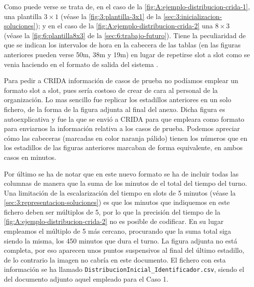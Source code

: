 Como puede verse se trata de, en el caso de la \autoref{fig:A:ejemplo-distribucion-crida-1}, una plantilla $3\times1$ (véase la \autoref{fig:3:plantilla-3x1} de la \autoref{sec:3:inicializacion-soluciones}); y en el caso de la \autoref{fig:A:ejemplo-distribucion-crida-2} una $8\times3$ (véase la \autoref{fig:6:plantilla8x3} de la \autoref{sec:6:trabajo-futuro}). Tiene la peculiaridad de que se indican los intervalos de hora en la cabecera de las tablas (en las figuras anteriores pueden verse 50m, 38m y 19m) en lugar de repetirse slot a slot como se venia haciendo en el formato de salida del sistema \legacy{}. 

Para pedir a CRIDA información de casos de prueba no podíamos emplear un formato slot a slot, pues sería costoso de crear de cara al personal de la organización. Lo mas sencillo fue replicar los estadillos anteriores en un solo fichero, de la forma de la figura adjunta al final del anexo. Dicha figura es autoexplicativa y fue la que se envió a CRIDA para que empleara como formato para enviarnos la información relativa a los casos de prueba. Podemos apreciar cómo las cabeceras (marcadas en color naranja pálido) tienen los números que en los estadillos de las figuras anteriores marcaban de forma equivalente, en ambos casos en minutos.

Por último se ha de notar que en este nuevo formato se ha de incluir todas las columnas de manera que la suma de los minutos de el total del tiempo del turno. Una limitación de la escalarización del tiempo en slots de 5 minutos (véase la \autoref{sec:3:representacion-soluciones}) es que los minutos que indiquemos en este fichero deben ser múltiplos de 5, por lo que la precisión del tiempo de la \autoref{fig:A:ejemplo-distribucion-crida-2} no es posible de codificar. En su lugar empleamos el múltiplo de 5 más cercano, procurando que la suma total siga siendo la misma, los 450 minutos que dura el turno. La figura adjunta no está completa, por eso aparecen unos puntos suspensivos al final del último estadillo, de lo contrario la imagen no cabría en este documento. El fichero con esta información se ha llamado \texttt{DistribucionInicial\_Identificador.csv}, siendo el del documento adjunto aquel empleado para el Caso 1.

\begin{landscape}
	
\end{landscape}
